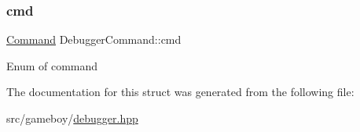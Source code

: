 \subsubsection{\texorpdfstring{cmd}{cmd}}
{\footnotesize\ttfamily \mbox{\hyperlink{debugger_8hpp_a2afce0a47a93eee73a314d53e4890153}{Command}} Debugger\+Command\+::cmd}

Enum of command 

The documentation for this struct was generated from the following file\+:\begin{DoxyCompactItemize}
\item 
src/gameboy/\mbox{\hyperlink{debugger_8hpp}{debugger.\+hpp}}\end{DoxyCompactItemize}
